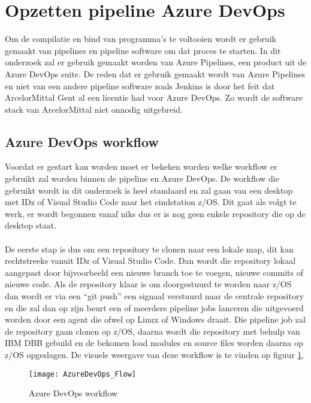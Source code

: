 \pagebreak

\section{Opzetten pipeline Azure DevOps}
Om de compilatie en bind van programma's te voltooien wordt er gebruik gemaakt van pipelines en pipeline software om dat proces te starten. In dit onderzoek zal er gebruik gemaakt worden van Azure Pipelines, een product uit de Azure DevOps suite. De reden dat er gebruik gemaakt wordt van Azure Pipelines en niet van een andere pipeline software zoals Jenkins is door het feit dat ArcelorMittal Gent al een licentie had voor Azure DevOps. Zo wordt de software stack van ArcelorMittal niet onnodig uitgebreid. 

\subsection{Azure DevOps workflow}
Voordat er gestart kan worden moet er bekeken worden welke workflow er gebruikt zal worden binnen de pipeline en Azure DevOps. De workflow die gebruikt wordt in dit onderzoek is heel standaard en zal gaan van een desktop met IDz of Visual Studio Code naar het eindstation z/OS. Dit gaat als volgt te werk, er wordt begonnen vanaf niks dus er is nog geen enkele repository die op de desktop staat. 
\\ \\
De eerste stap is dus om een repository te clonen naar een lokale map, dit kan rechtstreeks vanuit IDz of Visual Studio Code. Dan wordt die repository lokaal aangepast door bijvoorbeeld een nieuwe branch toe te voegen, nieuwe commits of nieuwe code. Als de repository klaar is om doorgestuurd te worden naar z/OS dan wordt er via een ``git push'' een signaal verstuurd naar de centrale repository en die zal dan op zijn beurt een of meerdere pipeline jobs lanceren die uitgevoerd worden door een agent die ofwel op Linux of Windows draait. Die pipeline job zal de repository gaan clonen op z/OS, daarna wordt die repository met behulp van IBM DBB gebuild en de bekomen load modules en source files worden daarna op z/OS opgeslagen. De visuele weergave van deze workflow is te vinden op figuur \ref{fig:azure devops flow}.
\begin{figure}[h]
    \centering
    \texttt{[image: AzureDevOps\_Flow]}
    \caption{Azure DevOps workflow}
    \label{fig:azure devops flow}
\end{figure}

